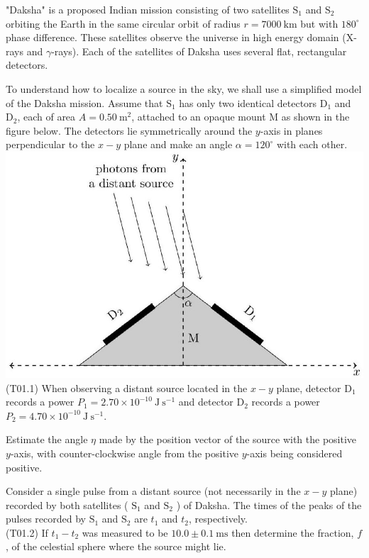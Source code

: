 \documentclass[10pt]{article}
\begin{document}
    "Daksha" is a proposed Indian mission consisting of two satellites $\mathrm{S}_{1}$ and $\mathrm{S}_{2}$ orbiting the Earth in the same circular orbit of radius $r=7000 \mathrm{~km}$ but with $180^{\circ}$ phase difference. These satellites observe the universe in high energy domain (X-rays and $\gamma$-rays). Each of the satellites of Daksha uses several flat, rectangular detectors.

    To understand how to localize a source in the sky, we shall use a simplified model of the Daksha mission. Assume that $\mathrm{S}_{1}$ has only two identical detectors $\mathrm{D}_{1}$ and $\mathrm{D}_{2}$, each of area $A=0.50 \mathrm{~m}^{2}$, attached to an opaque mount M as shown in the figure below. The detectors lie symmetrically around the $y$-axis in planes perpendicular to the $x-y$ plane and make an angle $\alpha=120^{\circ}$ with each other.\\
    \includegraphics[max width=\textwidth, center]{2025_08_23_e94579452776a99c4850g-01}\\
    (T01.1) When observing a distant source located in the $x-y$ plane, detector $\mathrm{D}_{1}$ records a power $P_{1}= 2.70 \times 10^{-10} \mathrm{~J} \mathrm{~s}^{-1}$ and detector $\mathrm{D}_{2}$ records a power $P_{2}=4.70 \times 10^{-10} \mathrm{~J} \mathrm{~s}^{-1}$.
    
    Estimate the angle $\eta$ made by the position vector of the source with the positive $y$-axis, with counter-clockwise angle from the positive $y$-axis being considered positive.
    
    Consider a single pulse from a distant source (not necessarily in the $x-y$ plane) recorded by both satellites ( $\mathrm{S}_{1}$ and $\mathrm{S}_{2}$ ) of Daksha. The times of the peaks of the pulses recorded by $\mathrm{S}_{1}$ and $\mathrm{S}_{2}$ are $t_{1}$ and $t_{2}$, respectively.\\
    (T01.2) If $t_{1}-t_{2}$ was measured to be $10.0 \pm 0.1 \mathrm{~ms}$ then determine the fraction, $f$, of the celestial sphere where the source might lie.
\end{document}
